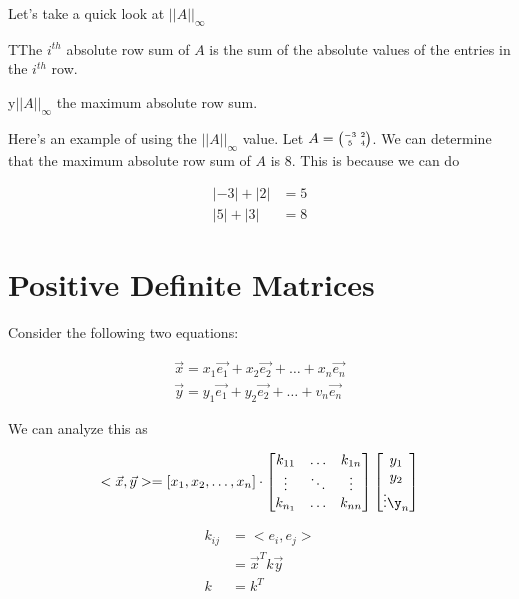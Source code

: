 	Let's take a quick look at $| | A | |_\infty$

	\begin{definition}
		TThe $i^{th}$ absolute row sum of $A$ is the sum of the absolute values of the entries in the $i^{th}$ row.
	\end{definition}

	\begin{theorem}
		y$| | A | |_\infty$ the maximum absolute row sum.
	\end{theorem}

	Here's an example of using the $| | A | |_\infty$ value. Let $A=\SmallMatrix{-3&2\\5&4}$. We can determine that the maximum absolute row sum of $A$ is 8. This is because we can do 

	\begin{align}
		|-3|+|2|&=5\\
		|5|+|3|&=\boxed{8}
	\end{align}
\section{Positive Definite Matrices}

	Consider the following two equations:

	\begin{align}
		\vec{x}=x_1\vec{e_1}+x_2\vec{e_2}+\ldots+x_n\vec{e_n}\\
		\vec{y}=y_1\vec{e_1}+y_2\vec{e_2}+\ldots+v_n\vec{e_n}
	\end{align}

	We can analyze this as 

	\begin{equation}
		<\vec{x},\vec{y}> = [x_1,x_2,\ldots,x_n]\cdot \begin{bmatrix} k_{11}&\ldots&k_{1n}\\ \vdots&\ddots&\vdots\\ k_{n_1}&\ldots&k_{nn} \end{bmatrix} \begin{bmatrix} y_1\\y_2\\ \vdots \y_n \end{bmatrix} 
	\end{equation}

	\begin{align}
		k_{ij}&= <e_i,e_j>\\
		&=\vec{x}^Tk\vec{y}\\
		k&=k^T
	\end{align}

